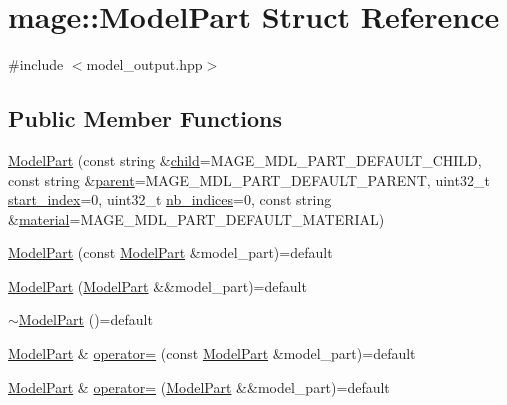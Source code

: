 \hypertarget{structmage_1_1_model_part}{}\section{mage\+:\+:Model\+Part Struct Reference}
\label{structmage_1_1_model_part}


{\ttfamily \#include $<$model\+\_\+output.\+hpp$>$}

\subsection*{Public Member Functions}
\begin{DoxyCompactItemize}
\item 
\hyperlink{structmage_1_1_model_part_a4a9443af884ad45625f894ae33eaac32}{Model\+Part} (const string \&\hyperlink{structmage_1_1_model_part_a3ab6e2faae44453d60cf0ff4876f49eb}{child}=M\+A\+G\+E\+\_\+\+M\+D\+L\+\_\+\+P\+A\+R\+T\+\_\+\+D\+E\+F\+A\+U\+L\+T\+\_\+\+C\+H\+I\+LD, const string \&\hyperlink{structmage_1_1_model_part_abd5387d6a21aa47bce04565c5333f83e}{parent}=M\+A\+G\+E\+\_\+\+M\+D\+L\+\_\+\+P\+A\+R\+T\+\_\+\+D\+E\+F\+A\+U\+L\+T\+\_\+\+P\+A\+R\+E\+NT, uint32\+\_\+t \hyperlink{structmage_1_1_model_part_af889f5bd847555d544d0ee07187e0115}{start\+\_\+index}=0, uint32\+\_\+t \hyperlink{structmage_1_1_model_part_a4b7d8beddffa117e1f6829e6c9acfce3}{nb\+\_\+indices}=0, const string \&\hyperlink{structmage_1_1_model_part_a4b0bfbb9ac313b6ffe8a8a3ee27469fd}{material}=M\+A\+G\+E\+\_\+\+M\+D\+L\+\_\+\+P\+A\+R\+T\+\_\+\+D\+E\+F\+A\+U\+L\+T\+\_\+\+M\+A\+T\+E\+R\+I\+AL)
\item 
\hyperlink{structmage_1_1_model_part_a3c39c2c312f07687f8ad5c2c2580d1e2}{Model\+Part} (const \hyperlink{structmage_1_1_model_part}{Model\+Part} \&model\+\_\+part)=default
\item 
\hyperlink{structmage_1_1_model_part_af8744793e9e6eccd59211c87ffc8e745}{Model\+Part} (\hyperlink{structmage_1_1_model_part}{Model\+Part} \&\&model\+\_\+part)=default
\item 
\hyperlink{structmage_1_1_model_part_a3322c5c7924ec30be170ae1ed6dca550}{$\sim$\+Model\+Part} ()=default
\item 
\hyperlink{structmage_1_1_model_part}{Model\+Part} \& \hyperlink{structmage_1_1_model_part_a37e9d66b701ed84111160bf5a003b658}{operator=} (const \hyperlink{structmage_1_1_model_part}{Model\+Part} \&model\+\_\+part)=default
\item 
\hyperlink{structmage_1_1_model_part}{Model\+Part} \& \hyperlink{structmage_1_1_model_part_a8337b8034d9a43514690a2db3d0f43c7}{operator=} (\hyperlink{structmage_1_1_model_part}{Model\+Part} \&\&model\+\_\+part)=default
\end{DoxyCompactItemize}
